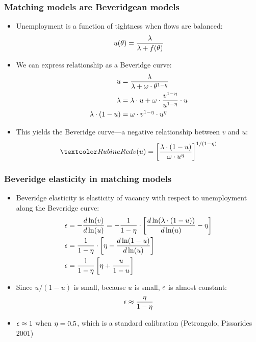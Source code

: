 \documentclass[11pt,aspectratio=169,xcolor={dvipsnames},hyperref={pdftex,pdfpagemode=UseNone,hidelinks,pdfdisplaydoctitle=true},usepdftitle=false]{beamer}
\begin{document}
\begin{frame}
\frametitle{Matching models are Beveridgean models}
\begin{itemize}
\item Unemployment is a function of tightness when flows are balanced:
\begin{equation*}
u(\theta) = \frac{\lambda}{\lambda + f(\theta)}
\end{equation*}
\item We can express relationship as a Beveridge curve:
\begin{align*}
u & = \frac{\lambda}{\lambda + \omega\cdot \theta^{1-\eta}}\\
\lambda & = \lambda \cdot u+ \omega\cdot \frac{v^{1-\eta}}{u^{1-\eta}}\cdot u\\
\lambda \cdot(1-u) & = \omega\cdot v^{1-\eta} \cdot u^{\eta}
\end{align*}
\item This yields the Beveridge curve---a negative relationship between $v$ and $u$:
\begin{equation*}
\al{v(u) = \bs{\frac{\l \cdot (1-u)}{\o \cdot u^{\h}}}^{1/(1-\h)}}
\end{equation*}
\end{itemize}
\end{frame}

\begin{frame}
\frametitle{Beveridge elasticity in matching models}
\begin{itemize}
\item Beveridge elasticity is elasticity of vacancy with respect to unemployment along the Beveridge curve:
\begin{align*}
\e & = -\oe{v}{u} = -\frac{1}{1-\h}\cdot \bs{\oe{\l \cdot (1-u)}{u}- \h}\\
\e &= \frac{1}{1-\h}\cdot \bs{ \h - \oe{1-u}{u}}\\
\e &= \frac{1}{1-\h}\bs{\h+ \frac{u}{1-u}}
\end{align*}
\item Since $u/(1-u)$ is small, because $u$ is small, $\epsilon$ is almost constant:
\begin{equation*}
\epsilon \approx \frac{\eta}{1-\eta}
\end{equation*}
\item $\epsilon \approx 1$ when $\eta = 0.5$, which is a standard calibration (Petrongolo, Pissarides 2001)
\end{itemize}
\end{frame}

\begin{frame}
\end{frame}
\end{document}
